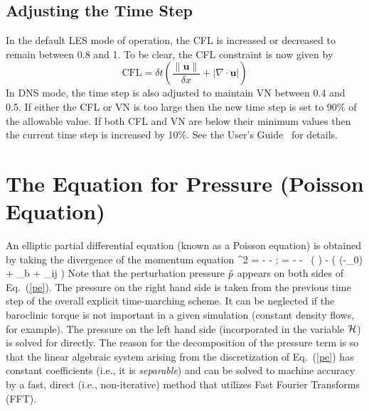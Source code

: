 \subsection{Adjusting the Time Step}

In the default LES mode of operation, the CFL is increased or decreased to remain between 0.8 and 1.  To be clear, the CFL constraint is now given by
\begin{equation}
\mbox{CFL} = \delta t \left( \frac{\|\mathbf{u}\|}{\delta x} + |\nabla\cdot\mathbf{u}| \right)
\end{equation}
In DNS mode, the time step is also adjusted to maintain VN between 0.4 and 0.5. If either the CFL or VN is too large then the new time step is set to 90\% of the allowable value.  If both CFL and VN are below their minimum values then the current time step is increased by 10\%.  See the User's Guide~\cite{FDS_Users_Guide} for details.

\newpage
\section{The Equation for Pressure (Poisson Equation)}

An elliptic partial differential equation (known as a Poisson equation) is obtained by
taking the divergence of the momentum equation
\be \nabla^2 \calH =
     - - \nabla\!\cdot \bF
    \quad ; \quad \bF = - \bu\times\bo - \tp \, \nabla \! \left(  \right) - 
    \Big( (\rho-\rho_0) \bg + \bof_{\rm b} + \nabla\!\cdot \btau_{ij} \Big)
   \label{pe}\ee
Note that the perturbation pressure $\tilde{p}$ appears on both sides of Eq.~(\ref{pe}). The
pressure on the right hand side is taken from the previous time step of the
overall explicit time-marching scheme. It can be neglected if the baroclinic torque is
not important in a given simulation (constant density flows, for example). The pressure on the left hand side (incorporated
in the variable $\mathcal{H}$) is solved for directly.
The reason for the decomposition of the pressure term is so that the linear algebraic system
arising from the discretization of Eq.~(\ref{pe})
has constant coefficients (i.e., it is {\em separable}) and can be solved to machine accuracy
by a fast, direct (i.e., non-iterative) method that utilizes
Fast Fourier Transforms (FFT).

